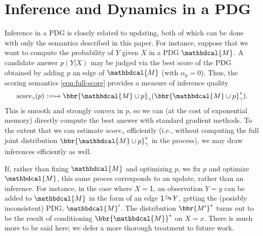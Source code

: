 \documentclass[letterpaper]{article} %
\theoremstyle{plain}
\theoremstyle{definition}
\theoremstyle{remark}
\newcommand{\dg}[1]{\mathbdcal{#1}}
\newcommand{\var}[1]{\mathsf{#1}}
\newcommand{\ed}[3]{#2\!%
  \overset{\smash{\mskip-5mu\raisebox{-1pt}{$\scriptscriptstyle
        #1$}}}{\rightarrow}\! #3}
\begin{document}
\section{Inference and Dynamics in a PDG} \label{sec:inference}
Inference in a PDG is closely related to updating, both of which can be done
with only the semantics described in this paper.  For instance, suppose that we
want to compute the probability of $Y$ given $X$ in a PDG $\dg M$. A candidate
answer $p(Y|X)$ may be judged via the best score of the PDG obtained by adding
$p$ an edge of $\dg M$ (with $\alpha_p=0$). Thus, the scoring semantics
\eqref{eqn:full-score} provides a measure of inference quality 
$$\mathit{score}_\gamma(p) := \mapsto \bbr{\dg M \cup p}_\gamma(\bbr{\dg M \cup p}_\gamma^*).$$
This is smooth and strongly convex in $p$, so we can (at the cost of exponential
memory) directly compute the best answer with standard gradient methods. 
To the extent that we can estimate $\mathit{score}_\gamma$ efficiently 
(i.e., without computing the full joint distribution $\bbr{\dg M \cup p}_\gamma^*$ in the process), we may draw inferences efficiently as well. 

If, rather than fixing $\dg M$ and optimizing $p$, we fix $p$ and optimize $\dg M$,
this same proces corresponds to an update, rather than an inference. For instance, in
the case where $X = \var 1$, an observation $Y\!=\!y$  can be added to $\dg M$ in the form of an edge $\ed{\delta_y}{\var 1}Y$, getting the (posisbly inconsistent) PDG, 
$\dg M'
$. The distribution $\bbr{M'}^*$ turns out
to be the result of conditioning $\bbr{\dg M}^*$ on $X\!=\!x$.  
%
There is much more to be said here;
we defer a more thorough treatment to future work.
\end{document}
